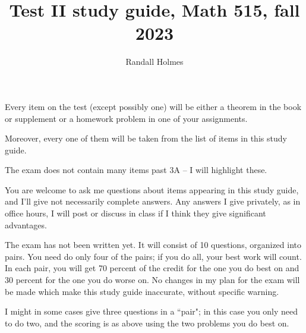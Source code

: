 \documentclass[12pt]{article}
\title{Test II  study guide, Math 515, fall 2023}
\author{Randall Holmes}
\begin{document}
\maketitle

Every item on the test (except possibly one) will be either a theorem in the book or supplement or a homework problem in one of your assignments.

Moreover, every one of them will be taken from the list of items in this study guide.

The exam does not contain many items past 3A -- I will highlight these.

You are welcome to ask me questions about items appearing in this study guide, and I'll give not necessarily complete answers.  Any answers I give privately, as in office hours, I will post or discuss in class if I think they give significant advantages.

The exam has not been written yet.  It will consist of 10 questions, organized into pairs.  You need do only four of the pairs;  if you do all, your best work will count.  In each pair, you will get 70 percent of the credit for the one you do best on and 30 percent for the one you do worse on.  No changes in my plan for the exam will be made which make this study guide inaccurate, without specific warning.

I might in some cases give three questions in a ``pair";  in this case you only need to do two, and the scoring is as above using the two problems you do best on.
\end{document}
